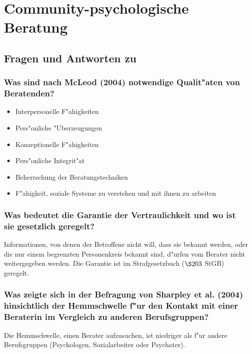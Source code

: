 \section{Community-psychologische Beratung}
\subsection{Fragen und Antworten zu \textcite{warschburger_theoretischer_2009}}
\subsubsection{Was sind nach McLeod (2004) notwendige Qualit"aten von Beratenden?}
\begin{itemize}
        \item Interpersonelle F"ahigkeiten
        \item Pers"onliche "Uberzeugungen
        \item Konzeptionelle F"ahigkeiten
        \item Pers"onliche Integrit"at
        \item Beherrschung der Beratungstechniken
        \item F"ahigkeit, soziale Systeme zu verstehen und mit ihnen zu arbeiten
\end{itemize}

\subsubsection{Was bedeutet die Garantie der Vertraulichkeit und wo ist sie gesetzlich geregelt?}
Informationen, von denen der Betroffene nicht will, dass sie bekannt werden, oder die nur einem begrenzten Personenkreis bekannt sind, d"urfen vom Berater nicht weitergegeben werden. Die Garantie ist im Strafgesetzbuch ($\S 203$ StGB) geregelt. 

\subsubsection{Was zeigte sich in der Befragung von Sharpley et al. (2004) hinsichtlich der Hemmschwelle f"ur den Kontakt mit einer Beraterin im Vergleich zu anderen Berufsgruppen?}
Die Hemmschwelle, einen Berater aufzusuchen, ist niedriger als f"ur andere Berufsgruppen (Psychologen, Sozialarbeiter oder Psychater). 

